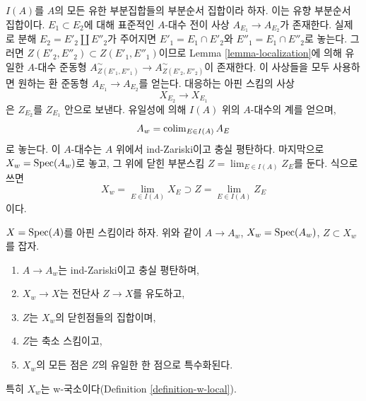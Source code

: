 \medskip\noindent
$I(A)$를 $A$의 모든 유한 부분집합들의 부분순서 집합이라 하자.
이는 유향 부분순서 집합이다.
$E_1 \subset E_2$에 대해 표준적인 $A$-대수 전이 사상
$A_{E_1} \to A_{E_2}$가 존재한다.
실제로 분해 $E_2 = E'_2 \amalg E''_2$가 주어지면
$E'_1 = E_1 \cap E'_2$와 $E''_1 = E_1 \cap E''_2$로 놓는다.
그러면 $Z(E'_2, E''_2) \subset Z(E'_1, E''_1)$이므로
Lemma \ref{lemma-localization}에 의해 유일한 $A$-대수 준동형
$A_{Z(E'_1, E''_1)}^\sim \to A_{Z(E'_2, E''_2)}^\sim$이 존재한다.
이 사상들을 모두 사용하면 원하는 환 준동형
$A_{E_1} \to A_{E_2}$를 얻는다. 대응하는 아핀 스킴의 사상
\begin{equation}
\label{equation-transition}
X_{E_2} \longrightarrow X_{E_1}
\end{equation}
은 $Z_{E_2}$를 $Z_{E_1}$ 안으로 보낸다.
유일성에 의해 $I(A)$ 위의 $A$-대수의 계를 얻으며,
\begin{equation}
\label{equation-colimit-ring}
A_w = \mathop{\mathrm{colim}}\nolimits_{E \in I(A)} A_E
\end{equation}
로 놓는다. 이 $A$-대수는 $A$ 위에서 ind-Zariski이고 충실 평탄하다.
마지막으로 $X_w = \mathop{\mathrm{Spec}}(A_w)$로 놓고, 그 위에 닫힌 부분스킴
$Z = \lim_{E \in I(A)} Z_E$를 둔다. 식으로 쓰면
\begin{equation}
\label{equation-final}
X_w = \lim_{E \in I(A)} X_E \supset Z = \lim_{E \in I(A)} Z_E
\end{equation}
이다.

\begin{lemma}
\label{lemma-make-w-local}
$X = \mathop{\mathrm{Spec}}(A)$를 아핀 스킴이라 하자.
위와 같이 $A \to A_w$, $X_w = \mathop{\mathrm{Spec}}(A_w)$, $Z \subset X_w$를 잡자.
\begin{enumerate}
\item $A \to A_w$는 ind-Zariski이고 충실 평탄하며,
\item $X_w \to X$는 전단사 $Z \to X$를 유도하고,
\item $Z$는 $X_w$의 닫힌점들의 집합이며,
\item $Z$는 축소 스킴이고,
\item $X_w$의 모든 점은 $Z$의 유일한 한 점으로 특수화된다.
\end{enumerate}
특히 $X_w$는 w-국소이다(Definition \ref{definition-w-local}).
\end{lemma}

